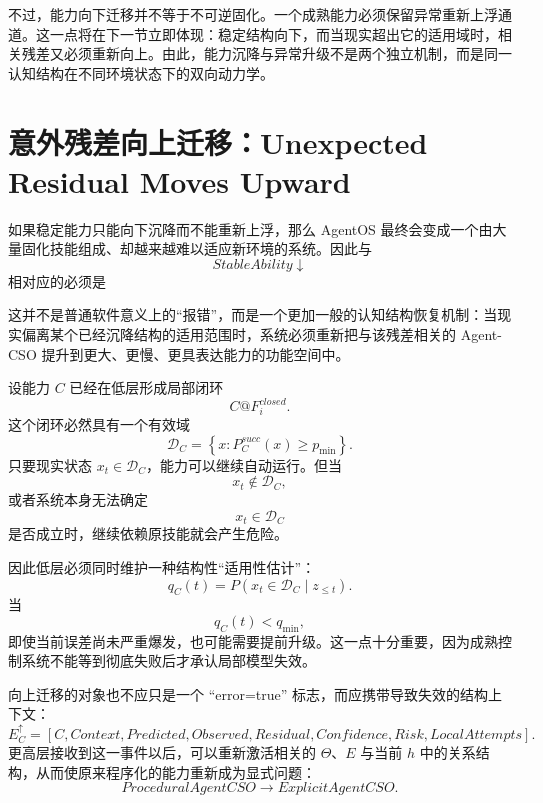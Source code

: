 不过，能力向下迁移并不等于不可逆固化。一个成熟能力必须保留异常重新上浮通道。这一点将在下一节立即体现：稳定结构向下，而当现实超出它的适用域时，相关残差又必须重新向上。由此，能力沉降与异常升级不是两个独立机制，而是同一认知结构在不同环境状态下的双向动力学。

\section{意外残差向上迁移：Unexpected Residual Moves Upward}

如果稳定能力只能向下沉降而不能重新上浮，那么 AgentOS 最终会变成一个由大量固化技能组成、却越来越难以适应新环境的系统。因此与
\[
StableAbility\downarrow
\]
相对应的必须是
\begin{statementbox}
\centering
{}
\end{statementbox}
这并不是普通软件意义上的``报错''，而是一个更加一般的认知结构恢复机制：当现实偏离某个已经沉降结构的适用范围时，系统必须重新把与该残差相关的 Agent-CSO 提升到更大、更慢、更具表达能力的功能空间中。

设能力 $C$ 已经在低层形成局部闭环
\begin{equation}
C@F_i^{closed}.
\end{equation}
这个闭环必然具有一个有效域
\begin{equation}
\mathcal D_C
=
\left\{
x:
P_C^{succ}(x)\geq p_{\min}
\right\}.
\end{equation}
只要现实状态 $x_t\in\mathcal D_C$，能力可以继续自动运行。但当
\begin{equation}
x_t\notin\mathcal D_C,
\end{equation}
或者系统本身无法确定
\[
x_t\in\mathcal D_C
\]
是否成立时，继续依赖原技能就会产生危险。

因此低层必须同时维护一种结构性``适用性估计''：
\begin{equation}
q_C(t)
=
P
\left(
x_t\in\mathcal D_C
\mid
z_{\leq t}
\right).
\end{equation}
当
\[
q_C(t)<q_{\min},
\]
即使当前误差尚未严重爆发，也可能需要提前升级。这一点十分重要，因为成熟控制系统不能等到彻底失败后才承认局部模型失效。

向上迁移的对象也不应只是一个 ``error=true'' 标志，而应携带导致失效的结构上下文：
\begin{equation}
E_C^\uparrow
=
\left[
C,
Context,
Predicted,
Observed,
Residual,
Confidence,
Risk,
LocalAttempts
\right].
\end{equation}
更高层接收到这一事件以后，可以重新激活相关的 $\Theta$、$E$ 与当前 $h$ 中的关系结构，从而使原来程序化的能力重新成为显式问题：
\begin{equation}
ProceduralAgentCSO
\rightarrow
ExplicitAgentCSO.
\end{equation}


